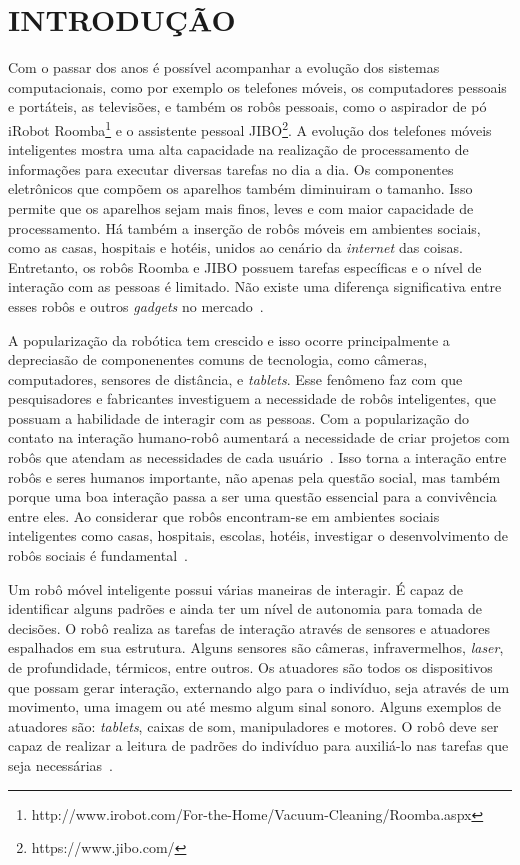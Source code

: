 \chapter{INTRODUÇÃO}
\label{cap:introducao}
Com o passar dos anos é possível acompanhar a evolução dos sistemas computacionais, como por exemplo os telefones móveis, os computadores pessoais e portáteis, as televisões, e também os robôs pessoais, como o aspirador de pó iRobot Roomba\footnote{http://www.irobot.com/For-the-Home/Vacuum-Cleaning/Roomba.aspx} e o assistente pessoal JIBO\footnote{https://www.jibo.com/}. A evolução dos telefones móveis inteligentes mostra uma alta capacidade na realização de processamento de informações para executar diversas tarefas no dia a dia. Os componentes eletrônicos que compõem os aparelhos também diminuiram o tamanho. Isso permite que os aparelhos sejam mais finos, leves e com maior capacidade de processamento. Há também a inserção de robôs móveis em ambientes sociais, como as casas, hospitais e hotéis, unidos ao cenário da \emph{internet} das coisas. Entretanto, os robôs Roomba e JIBO possuem tarefas específicas e o nível de interação com as pessoas é limitado. Não existe uma diferença significativa entre esses robôs e outros \emph{gadgets} no mercado~\cite{heenan:2014}.

A popularização da robótica tem crescido e isso ocorre principalmente a depreciasão de componenentes comuns de tecnologia, como câmeras, computadores, sensores de distância, e \emph{tablets}. Esse fenômeno faz com que pesquisadores e fabricantes investiguem a necessidade de robôs inteligentes, que possuam a habilidade de interagir com as pessoas. Com a popularização do contato na interação humano-robô aumentará a necessidade de criar projetos com robôs que atendam as necessidades de cada usuário~\cite{looi:2012}. Isso torna a interação entre robôs e seres humanos importante, não apenas pela questão social, mas também porque uma boa interação passa a ser uma questão essencial para a convivência entre eles. Ao considerar que robôs encontram-se em ambientes sociais inteligentes como casas, hospitais, escolas, hotéis, investigar o desenvolvimento de robôs sociais é fundamental~\cite{albo-canals:2013, brown:2013}.

Um robô móvel inteligente possui várias maneiras de interagir. É capaz de identificar alguns padrões e ainda ter um nível de autonomia para tomada de decisões. O robô realiza as tarefas de interação através de sensores e atuadores espalhados em sua estrutura. Alguns sensores são câmeras, infravermelhos, \emph{laser}, de profundidade, térmicos, entre outros. Os atuadores são todos os dispositivos que possam gerar interação, externando algo para o indivíduo, seja através de um movimento, uma imagem ou até mesmo algum sinal sonoro. Alguns exemplos de atuadores são: \emph{tablets}, caixas de som, manipuladores e motores. O robô deve ser capaz de realizar a leitura de padrões do indivíduo para auxiliá-lo nas tarefas que seja necessárias~\cite{looi:2012, choi:2014, dobra:2014}.

